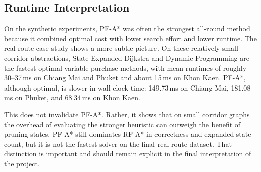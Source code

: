 \subsection*{Runtime Interpretation}

On the synthetic experiments, PF-A* was often the strongest all-round method because it
combined optimal cost with lower search effort and lower runtime.
The real-route case study shows a more subtle picture.
On these relatively small corridor abstractions, State-Expanded Dijkstra and Dynamic
Programming are the fastest optimal variable-purchase methods, with mean runtimes of roughly
30--37\,ms on Chiang Mai and Phuket and about 15\,ms on Khon Kaen.
PF-A*, although optimal, is slower in wall-clock time: 149.73\,ms on Chiang Mai, 181.08\,ms on
Phuket, and 68.34\,ms on Khon Kaen.

This does not invalidate PF-A*.
Rather, it shows that on small corridor graphs the overhead of evaluating the stronger
heuristic can outweigh the benefit of pruning states.
PF-A* still dominates RF-A* in correctness and expanded-state count, but it is not the fastest
solver on the final real-route dataset.
That distinction is important and should remain explicit in the final interpretation of the
project.

